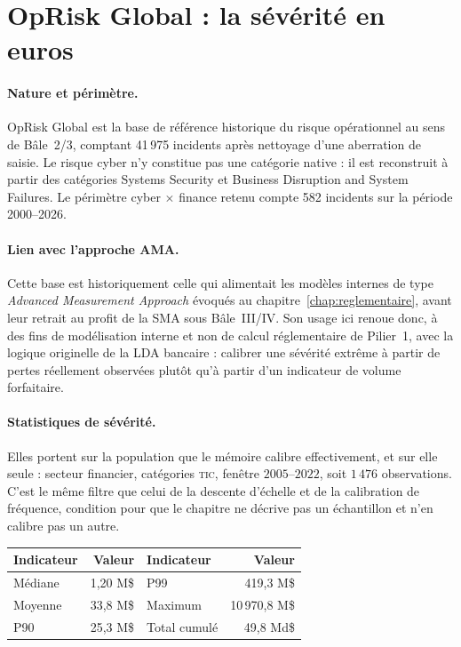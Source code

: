 

\section{OpRisk Global : la sévérité en euros}


\paragraph{Nature et périmètre.} OpRisk Global est la base de référence
historique du risque opérationnel au sens de Bâle~2/3, comptant
41\,975 incidents après nettoyage d'une aberration de saisie. Le
risque cyber n'y constitue pas une catégorie native : il est reconstruit à
partir des catégories \og Systems Security\fg{} et \og Business Disruption and
System Failures\fg{}. Le périmètre cyber $\times$ finance retenu compte
582 incidents sur la période 2000--2026.

\paragraph{Lien avec l'approche AMA.} Cette base est historiquement celle
qui alimentait les modèles internes de type \emph{Advanced Measurement
Approach} évoqués au chapitre~\ref{chap:reglementaire}, avant leur retrait au profit de la SMA sous
Bâle~III/IV. Son usage ici renoue donc, à des fins de modélisation interne et
non de calcul réglementaire de Pilier~1, avec la logique originelle de la LDA
bancaire : calibrer une sévérité extrême à partir de pertes réellement
observées plutôt qu'à partir d'un indicateur de volume forfaitaire.

\paragraph{Statistiques de sévérité.} Elles portent sur la population que le mémoire calibre
effectivement, et sur elle seule : secteur financier, catégories \textsc{tic}, fenêtre
$2005$--$2022$, soit $1\,476$ observations. C'est le même filtre que celui de la descente
d'échelle et de la calibration de fréquence, condition pour que le chapitre ne décrive pas un
échantillon et n'en calibre pas un autre.

\begin{center}
\renewcommand{\arraystretch}{1.3}
\begin{tabular}{l r l r}
\toprule
\rowcolor{lightblue}
\textbf{Indicateur} & \textbf{Valeur} & \textbf{Indicateur} & \textbf{Valeur} \\
\midrule
Médiane & 1{,}20 M\$ & P99 & 419{,}3 M\$ \\
Moyenne & 33{,}8 M\$ & Maximum & 10\,970{,}8 M\$ \\
P90 & 25{,}3 M\$ & Total cumulé & 49{,}8 Md\$ \\
\bottomrule
\end{tabular}
\end{center}

